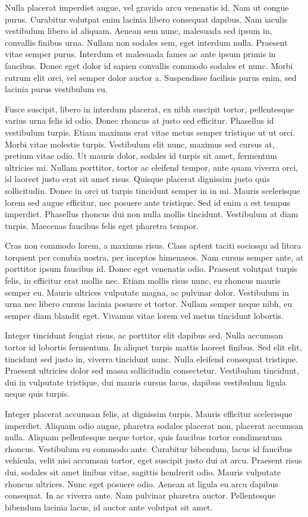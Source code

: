 Nulla placerat imperdiet augue, vel gravida arcu venenatis id. Nam ut congue purus. Curabitur volutpat enim lacinia libero consequat dapibus. Nam iaculis vestibulum libero id aliquam. Aenean sem nunc, malesuada sed ipsum in, convallis finibus urna. Nullam non sodales sem, eget interdum nulla. Praesent vitae semper purus. Interdum et malesuada fames ac ante ipsum primis in faucibus. Donec eget dolor id sapien convallis commodo sodales et nunc. Morbi rutrum elit orci, vel semper dolor auctor a. Suspendisse facilisis purus enim, sed lacinia purus vestibulum eu.

Fusce suscipit, libero in interdum placerat, ex nibh suscipit tortor, pellentesque varius urna felis id odio. Donec rhoncus at justo sed efficitur. Phasellus id vestibulum turpis. Etiam maximus erat vitae metus semper tristique ut ut orci. Morbi vitae molestie turpis. Vestibulum elit nunc, maximus sed cursus at, pretium vitae odio. Ut mauris dolor, sodales id turpis sit amet, fermentum ultricies mi. Nullam porttitor, tortor ac eleifend tempor, ante quam viverra orci, id laoreet justo erat sit amet risus. Quisque placerat dignissim justo quis sollicitudin. Donec in orci ut turpis tincidunt semper in in mi. Mauris scelerisque lorem sed augue efficitur, nec posuere ante tristique. Sed id enim a est tempus imperdiet. Phasellus rhoncus dui non nulla mollis tincidunt. Vestibulum at diam turpis. Maecenas faucibus felis eget pharetra tempor.

Cras non commodo lorem, a maximus risus. Class aptent taciti sociosqu ad litora torquent per conubia nostra, per inceptos himenaeos. Nam cursus semper ante, at porttitor ipsum faucibus id. Donec eget venenatis odio. Praesent volutpat turpis felis, in efficitur erat mollis nec. Etiam mollis risus nunc, eu rhoncus mauris semper eu. Mauris ultrices vulputate magna, ac pulvinar dolor. Vestibulum in urna nec libero cursus lacinia posuere et tortor. Nullam semper neque nibh, eu semper diam blandit eget. Vivamus vitae lorem vel metus tincidunt lobortis.

Integer tincidunt feugiat risus, ac porttitor elit dapibus sed. Nulla accumsan tortor id lobortis fermentum. In aliquet turpis mattis laoreet finibus. Sed elit elit, tincidunt sed justo in, viverra tincidunt nunc. Nulla eleifend consequat tristique. Praesent ultricies dolor sed massa sollicitudin consectetur. Vestibulum tincidunt, dui in vulputate tristique, dui mauris cursus lacus, dapibus vestibulum ligula neque quis turpis.

Integer placerat accumsan felis, at dignissim turpis. Mauris efficitur scelerisque imperdiet. Aliquam odio augue, pharetra sodales placerat non, placerat accumsan nulla. Aliquam pellentesque neque tortor, quis faucibus tortor condimentum rhoncus. Vestibulum eu commodo ante. Curabitur bibendum, lacus id faucibus vehicula, velit nisi accumsan tortor, eget suscipit justo dui at arcu. Praesent risus dui, sodales sit amet finibus vitae, sagittis hendrerit odio. Mauris vulputate rhoncus ultrices. Nunc eget posuere odio. Aenean at ligula eu arcu dapibus consequat. In ac viverra ante. Nam pulvinar pharetra auctor. Pellentesque bibendum lacinia lacus, id auctor ante volutpat sit amet.

